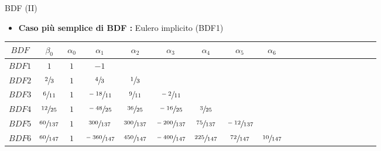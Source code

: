 \documentclass[aspectratio=169, 10pt, handout,usenames,dvipsnames]{beamer}
\begin{document}
    \begin{frame}{BDF (II)}
        \begin{itemize}
            \item \textbf{Caso più semplice di BDF :} Eulero implicito (BDF1)
        \end{itemize}

        \begin{table}[]
            \begin{tabular}{Sc|Sc|Sc|ScScScScScScSc}
            \( BDF \)& \(\beta_0\) & \(\alpha_0\) & \(\alpha_1\) & \(\alpha_2\)  & \(\alpha_3\) & \(\alpha_4\) & \(\alpha_5\) & \(\alpha_6\) \\
            \hline
            \(BDF1\)& \(1 \)       & \(1 \) & \(-1\)       &                             &          &         &         &        \\
            \(BDF2\)& \(\sfrac{2}{3} \)    & \(1\) & \(\sfrac{4}{3} \)     & \(\sfrac{1}{3} \)                         &          &         &         &        \\
            \(BDF3\)& \(\sfrac{6}{11} \)   & \(1\) & \(\sfrac{-18}{11} \)   & \(\sfrac{9}{11} \)                       & \(\sfrac{-2}{11}\)    &         &         &        \\
            \(BDF4\)& \(\sfrac{12}{25} \)  & \(1\) & \(\sfrac{-48}{25} \)   & \(\sfrac{36}{25} \)   & \(\sfrac{-16}{25}\)   & \(\sfrac{3}{25}\)   &         &        \\
            \(BDF5\)& \(\sfrac{60}{137} \) & \(1\) & \(\sfrac{300}{137} \)  & \(\sfrac{300}{137}\) & \(\sfrac{-200}{137}\) & \(\sfrac{75}{137}\)  & \(\sfrac{-12}{137}\) &        \\
            \(BDF6\)& \(\sfrac{60}{147} \) & \(1\) & \(\sfrac{-360}{147} \) & \(\sfrac{450}{147}\) & \(\sfrac{-400}{147}\) & \(\sfrac{225}{147}\) & \(\sfrac{72}{147}\) & \(\sfrac{10}{147}\)
            \end{tabular}
        \end{table}
    \end{frame}
\end{document}
